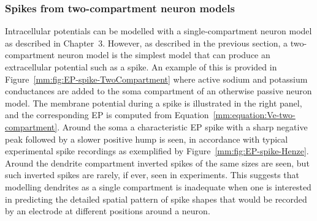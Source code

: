 \subsubsection{Spikes from two-compartment neuron models}
\label{spikes:sec:EP-spikes-two-compartment}
Intracellular potentials can be modelled with a single-compartment neuron model as described in Chapter~3.
However, as described in the previous section, 
a two-compartment neuron model is the simplest model that can produce an extracellular potential such as a 
spike. An example of this is provided in Figure~\ref{mm:fig:EP-spike-TwoCompartment} where active sodium and potassium conductances are added to the  soma compartment of an otherwise passive neuron model. 
The membrane potential during a spike is illustrated in the right panel, and the  
corresponding EP is computed from Equation~\ref{mm:equation:Ve-two-compartment}. Around the soma a characteristic
EP spike with a sharp negative peak followed by a slower positive hump is seen, in accordance with typical experimental
spike recordings as exemplified by Figure~\ref{mm:fig:EP-spike-Henze}. Around the dendrite compartment inverted
spikes of the same sizes are seen, but such inverted spikes are rarely, if ever, seen in experiments. This suggests that
modelling dendrites as a single compartment is inadequate when one is interested in predicting the detailed spatial pattern of 
spike shapes that would be recorded by an electrode at different positions around a neuron.                                                                                                                                                                                                                                                                                                                                                                                                                                                                                                                                                                                                                                                                                                                                                                                                                                                                                                                                                                                                                                                                                                                                 

